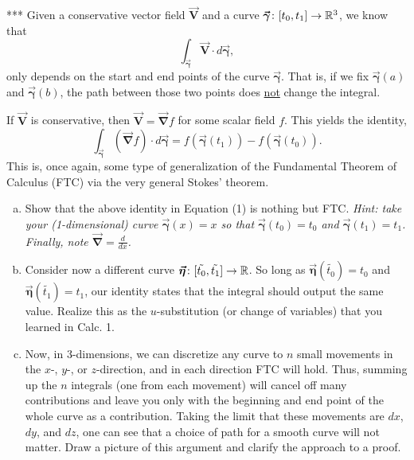 \documentclass[12pt]{article} %
\newcommand{\vecfieldV}{\boldsymbol{\vec{V}}}
\newcommand{\curvegamma}{\boldsymbol{\vec{\gamma}}}
\newcommand{\grad}{\boldsymbol{\vec{\nabla}}}
\newcommand{\curveeta}{\boldsymbol{\vec{\eta}}}
\begin{document}
\newpage
\begin{problem} ***
    Given a conservative vector field $\vecfieldV$ and a curve $\curvegamma \colon [t_0,t_1]\to \R^3$, we know that 
    \[
    \int_{\curvegamma} \vecfieldV\cdot d\curvegamma,
    \]
    only depends on the start and end points of the curve $\curvegamma$.  That is, if we fix $\curvegamma(a)$ and $\curvegamma(b)$, the path between those two points does \underline{not} change the integral.
    
    If $\vecfieldV$ is conservative, then $\vecfieldV = \grad f$ for some scalar field $f$.  This yields the identity,
    \begin{equation}
    \int_{\curvegamma} \left(\grad f\right) \cdot d\curvegamma = f(\curvegamma(t_1))-f(\curvegamma(t_0)).
    \end{equation}
    This is, once again, some type of generalization of the Fundamental Theorem of Calculus (FTC) via the very general Stokes' theorem.
    \begin{enumerate}[(a)]
        \item Show that the above identity in Equation (1) is nothing but FTC.  \emph{Hint: take your (1-dimensional) curve $\curvegamma(x)=x$ so that $\curvegamma(t_0)=t_0$ and $\curvegamma(t_1)=t_1$. Finally, note $\grad = \frac{d}{dx}$.}
        \item Consider now a different curve $\curveeta \colon [\tilde{t_0},\tilde{t_1}]\to \R$. So long as $\curveeta(\tilde{t_0})=t_0$ and $\curveeta(\tilde{t_1})=t_1$, our identity states that the integral should output the same value.  Realize this as the $u$-substitution (or change of variables) that you learned in Calc. 1.
        \item Now, in 3-dimensions, we can discretize any curve to $n$ small movements in the $x$-, $y$-, or $z$-direction, and in each direction FTC will hold.  Thus, summing up the $n$ integrals (one from each movement) will cancel off many contributions and leave you only with the beginning and end point of the whole curve as a contribution.  Taking the limit that these movements are $dx$, $dy$, and $dz$, one can see that a choice of path for a smooth curve will not matter.  Draw a picture of this argument and clarify the approach to a proof.
    \end{enumerate}
\end{problem}
\begin{solution}

\end{solution}
\end{document}
